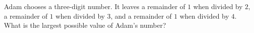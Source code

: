 Adam chooses a three-digit number. It leaves a remainder of $1$ when divided by $2$, a remainder of $1$ when divided by $3$, and a remainder of $1$ when divided by $4$. What is the largest possible value of Adam's number?
